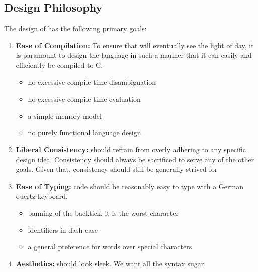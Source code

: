 \documentclass{article}
\begin{document}
\subsection{Design Philosophy}
The design of \lazydog has the following primary goals:
\begin{enumerate}
    \item {\bf Ease of Compilation:}
    To ensure that \lazydog will eventually see the light
    of day, it is paramount to design the language in such
    a manner that it can easily and efficiently be compiled
    to C.
    \begin{itemize}
        \item no excessive compile time disambiguation
        \item no excessive compile time evaluation
        \item a simple memory model
        \item no purely functional language design
    \end{itemize}
    \item {\bf Liberal Consistency:}
    \lazydog should refrain from overly adhering to any
    specific design idea. 
    Consistency should always be sacrificed to serve any
    of the other goals.
    Given that, consistency should still be generally strived for
    \item {\bf Ease of Typing:} \lazydog code should be
    reasonably easy to type with a German quertz keyboard.
    \begin{itemize}
        \item banning of the backtick, it is the worst character
        \item identifiers in \v{dash-case}
        \item a general preference for words over special characters
    \end{itemize}
    \item {\bf Aesthetics:} \lazydog should look sleek.
    We want all the syntax sugar.
    \setcounter{rememberEnumi}{\theenumi}
\end{enumerate}
\end{document}
